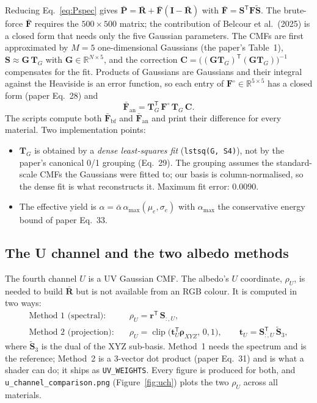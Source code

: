 \documentclass[11pt,a4paper]{article}
\newcommand{\mS}{\mathbf{S}}
\newcommand{\mSd}{\tilde{\mathbf{S}}}
\newcommand{\mRb}{\bar{\mathbf{R}}}
\newcommand{\mF}{\mathbf{F}}
\newcommand{\mFb}{\bar{\mathbf{F}}}
\newcommand{\mFc}{\mathbf{F}^{\circ}}
\newcommand{\mPb}{\bar{\mathbf{P}}}
\newcommand{\mC}{\mathbf{C}}
\newcommand{\mG}{\mathbf{G}}
\newcommand{\mTG}{\mathbf{T}_{\!G}}
\newcommand{\mI}{\mathbf{I}}
\newcommand{\vr}{\mathbf{r}}
\newcommand{\vrho}{\boldsymbol{\rho}}
\newcommand{\transp}{^{\mathsf{T}}}
\newcommand{\file}[1]{\texttt{#1}}
\newcommand{\code}[1]{\texttt{#1}}
\begin{document}
Reducing Eq.~\eqref{eq:Pspec} gives $\mPb = \mRb + \mFb(\mI-\mRb)$ with
$\mFb = \mS\transp\mF\mSd$.  The brute-force $\mFb$ requires the
$500\times500$ matrix; the contribution of Belcour et al.\ (2025) is a
closed form that needs only the five Gaussian parameters.  The CMFs are first
approximated by $M=5$ one-dimensional Gaussians (the paper's Table~1),
$\mS \approx \mG\,\mTG$ with $\mG\in\mathbb{R}^{N\times5}$, and the
correction $\mC = \big((\mG\mTG)\transp(\mG\mTG)\big)^{-1}$ compensates for the
fit.  Products of Gaussians are Gaussians and their integral against the
Heaviside is an error function, so each entry of
$\mFc\in\mathbb{R}^{5\times5}$ has a closed form (paper Eq.~28) and
\begin{equation}
  \mFb_{\text{an}} = \mTG\transp\,\mFc\,\mTG\,\mC .
  \label{eq:Fan}
\end{equation}
The scripts compute both $\mFb_{\text{bf}}$ and $\mFb_{\text{an}}$ and print
their difference for every material.  Two implementation points:
\begin{itemize}[nosep]
  \item $\mTG$ is obtained by a \emph{dense least-squares fit}
        (\code{lstsq(G, S4)}), not by the paper's canonical 0/1 grouping
        (Eq.~29).  The grouping assumes the standard-scale CMFs the Gaussians
        were fitted to; our basis is column-normalised, so the dense fit is
        what reconstructs it.  Maximum fit error: $0.0090$.
  \item The effective yield is $\alpha = \bar\alpha\,\alpha_{\max}(\mu_e,\sigma_e)$
        with $\alpha_{\max}$ the conservative energy bound of paper Eq.~33.
\end{itemize}

\subsection{The U channel and the two albedo methods}
\label{sec:umethods}

The fourth channel $U$ is a UV Gaussian CMF.  The albedo's $U$ coordinate,
$\rho_U$, is needed to build $\mRb$ but is not available from an RGB colour.
It is computed in two ways:
\begin{align}
  \text{Method 1 (spectral):}   &\quad \rho_U = \vr\transp\,\mS_{:,U}, \\
  \text{Method 2 (projection):} &\quad \rho_U = \operatorname{clip}\!\big(\mathbf{t}_U\transp\vrho_{XYZ},\,0,1\big),
  \qquad \mathbf{t}_U = \mS_{:,U}\transp\,\mSd_{3},
\end{align}
where $\mSd_3$ is the dual of the XYZ sub-basis.  Method~1 needs the spectrum
and is the reference; Method~2 is a $3$-vector dot product (paper Eq.~31) and
is what a shader can do; it ships as \code{UV\_WEIGHTS}.  Every figure is
produced for both, and \file{u\_channel\_comparison.png}
(Figure~\ref{fig:uch}) plots the two $\rho_U$ across all materials.
\end{document}
